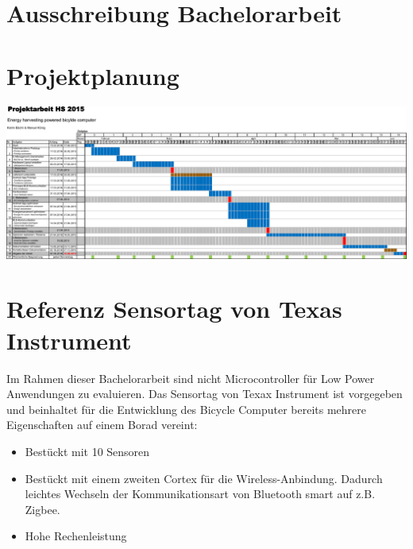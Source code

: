 
\appendix


\chapter{Ausschreibung Bachelorarbeit}\label{anhang_ausschreibung}
 



\chapter{Projektplanung}  \label{anhang_projektplan} 

\vspace*{\fill}\par
\pagebreak

\includegraphics[width=\textheight ,angle=90,origin=c]{../ressources/Projektorganisation/PlannungV0-cropped.pdf}

\chapter{Referenz Sensortag von Texas Instrument}\label{anhang_sensortag} 
Im Rahmen dieser Bachelorarbeit sind nicht Microcontroller für Low Power Anwendungen zu evaluieren. Das Sensortag von Texax Instrument ist vorgegeben und beinhaltet für die Entwicklung des Bicycle Computer bereits mehrere Eigenschaften auf einem Borad vereint:

\begin{itemize}
    \item Bestückt mit 10 Sensoren
    \item Bestückt mit einem zweiten Cortex für die Wireless-Anbindung.
          Dadurch leichtes Wechseln der Kommunikationsart von Bluetooth smart auf z.B. Zigbee.
    \item Hohe Rechenleistung
\end{itemize}


